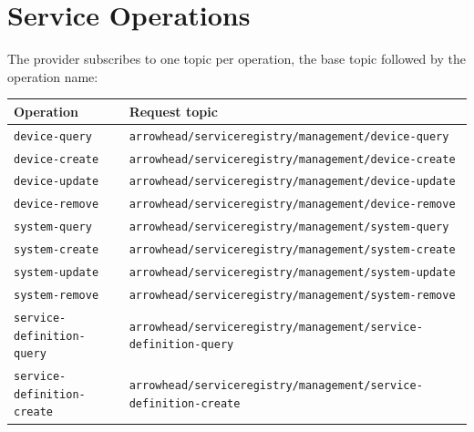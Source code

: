 \documentclass[a4paper]{arrowhead}
\begin{document}
\newpage

\section{Service Operations}
\label{sec:operations}

The provider subscribes to one topic per operation, the base topic followed by the operation name:

\noindent\begin{longtable}{| p{5cm} | p{10.4cm} |} \hline
\rowcolor{gray!33} Operation & Request topic \\ \hline \endhead
\texttt{device-\allowbreak{}query} & \texttt{arrowhead/\allowbreak{}serviceregistry/\allowbreak{}management/\allowbreak{}device-\allowbreak{}query} \\ \hline
\texttt{device-\allowbreak{}create} & \texttt{arrowhead/\allowbreak{}serviceregistry/\allowbreak{}management/\allowbreak{}device-\allowbreak{}create} \\ \hline
\texttt{device-\allowbreak{}update} & \texttt{arrowhead/\allowbreak{}serviceregistry/\allowbreak{}management/\allowbreak{}device-\allowbreak{}update} \\ \hline
\texttt{device-\allowbreak{}remove} & \texttt{arrowhead/\allowbreak{}serviceregistry/\allowbreak{}management/\allowbreak{}device-\allowbreak{}remove} \\ \hline
\texttt{system-\allowbreak{}query} & \texttt{arrowhead/\allowbreak{}serviceregistry/\allowbreak{}management/\allowbreak{}system-\allowbreak{}query} \\ \hline
\texttt{system-\allowbreak{}create} & \texttt{arrowhead/\allowbreak{}serviceregistry/\allowbreak{}management/\allowbreak{}system-\allowbreak{}create} \\ \hline
\texttt{system-\allowbreak{}update} & \texttt{arrowhead/\allowbreak{}serviceregistry/\allowbreak{}management/\allowbreak{}system-\allowbreak{}update} \\ \hline
\texttt{system-\allowbreak{}remove} & \texttt{arrowhead/\allowbreak{}serviceregistry/\allowbreak{}management/\allowbreak{}system-\allowbreak{}remove} \\ \hline
\texttt{service-\allowbreak{}definition-\allowbreak{}query} & \texttt{arrowhead/\allowbreak{}serviceregistry/\allowbreak{}management/\allowbreak{}service-\allowbreak{}definition-\allowbreak{}query} \\ \hline
\texttt{service-\allowbreak{}definition-\allowbreak{}create} & \texttt{arrowhead/\allowbreak{}serviceregistry/\allowbreak{}management/\allowbreak{}service-\allowbreak{}definition-\allowbreak{}create} \\ \hline

\end{longtable}
\end{document}
